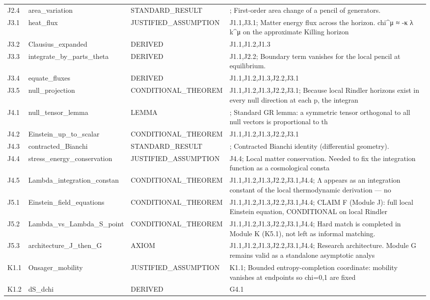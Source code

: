 \documentclass[11pt,a4paper]{article}
\theoremstyle{remark}\newtheorem*{caution}{Caution}
\begin{document}
{\begin{longtable}{@{}p{2.1cm}p{3.1cm}p{2.6cm}p{6cm}@{}}
J2.4 & area\_variation & STANDARD\_RESULT & ; First-order area change of a pencil of generators. \\
J3.1 & heat\_flux & JUSTIFIED\_ASSUMPTION & J1.1,J3.1; Matter energy flux across the horizon. chi^μ ≈ -κ λ k^μ on the approximate Killing horizon \\
J3.2 & Clausius\_expanded & DERIVED & J1.1,J1.2,J1.3 \\
J3.3 & integrate\_by\_parts\_theta & DERIVED & J1.1,J2.2; Boundary term vanishes for the local pencil at equilibrium. \\
J3.4 & equate\_fluxes & DERIVED & J1.1,J1.2,J1.3,J2.2,J3.1 \\
J3.5 & null\_projection & CONDITIONAL\_THEOREM & J1.1,J1.2,J1.3,J2.2,J3.1; Because local Rindler horizons exist in every null direction at each p, the integran \\
J4.1 & null\_tensor\_lemma & LEMMA & ; Standard GR lemma: a symmetric tensor orthogonal to all null vectors is proportional to th \\
J4.2 & Einstein\_up\_to\_scalar & CONDITIONAL\_THEOREM & J1.1,J1.2,J1.3,J2.2,J3.1 \\
J4.3 & contracted\_Bianchi & STANDARD\_RESULT & ; Contracted Bianchi identity (differential geometry). \\
J4.4 & stress\_energy\_conservation & JUSTIFIED\_ASSUMPTION & J4.4; Local matter conservation. Needed to fix the integration function as a cosmological consta \\
J4.5 & Lambda\_integration\_constan & CONDITIONAL\_THEOREM & J1.1,J1.2,J1.3,J2.2,J3.1,J4.4; Λ appears as an integration constant of the local thermodynamic derivation — no \\
J5.1 & Einstein\_field\_equations & CONDITIONAL\_THEOREM & J1.1,J1.2,J1.3,J2.2,J3.1,J4.4; CLAIM F (Module J): full local Einstein equation, CONDITIONAL on local Rindler  \\
J5.2 & Lambda\_vs\_Lambda\_S\_point & CONDITIONAL\_THEOREM & J1.1,J1.2,J1.3,J2.2,J3.1,J4.4; Hard match is completed in Module K (K5.1), not left as informal matching. \\
J5.3 & architecture\_J\_then\_G & AXIOM & J1.1,J1.2,J1.3,J2.2,J3.1,J4.4; Research architecture. Module G remains valid as a standalone asymptotic analys \\
K1.1 & Onsager\_mobility & JUSTIFIED\_ASSUMPTION & K1.1; Bounded entropy-completion coordinate: mobility vanishes at endpoints so chi=0,1 are fixed \\
K1.2 & dS\_dchi & DERIVED & G4.1 \\

\end{longtable}}
\end{document}
